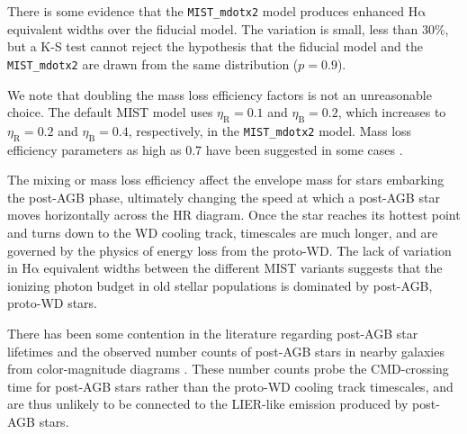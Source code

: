 \documentclass[preprint2]{aastex62}
\newcommand{\ha}{\ensuremath{\mathrm{H\alpha}}\xspace}
\begin{document}
There is some evidence that the {\tt MIST\_mdotx2} model produces enhanced \ha equivalent widths over the fiducial model. The variation is small, less than 30\%, but a K-S test cannot reject the hypothesis that the fiducial model and the {\tt MIST\_mdotx2} are drawn from the same distribution ($p=0.9$).

We note that doubling the mass loss efficiency factors is not an unreasonable choice. The default MIST model uses $\eta_{\mathrm{R}} = 0.1$ and $\eta_{\mathrm{B}} = 0.2$, which increases to $\eta_{\mathrm{R}} = 0.2$ and $\eta_{\mathrm{B}} = 0.4$, respectively, in the {\tt MIST\_mdotx2} model. Mass loss efficiency parameters as high as 0.7 have been suggested in some cases \citep{McDonald+2015}.

The mixing or mass loss efficiency affect the envelope mass for stars embarking the post-AGB phase, ultimately changing the speed at which a post-AGB star moves horizontally across the HR diagram. Once the star reaches its hottest point and turns down to the WD cooling track, timescales are much longer, and are governed by the physics of energy loss from the proto-WD. The lack of variation in \ha equivalent widths between the different MIST variants suggests that the ionizing photon budget in old stellar populations is dominated by post-AGB, proto-WD stars. 

There has been some contention in the literature regarding post-AGB star lifetimes and the observed number counts of post-AGB stars in nearby galaxies from color-magnitude diagrams \citep[CMDs; e.g.,][]{Brown+2008, Rosenfield+2012}. These number counts probe the CMD-crossing time for post-AGB stars rather than the proto-WD cooling track timescales, and are thus unlikely to be connected to the LIER-like emission produced by post-AGB stars.

\end{document}

